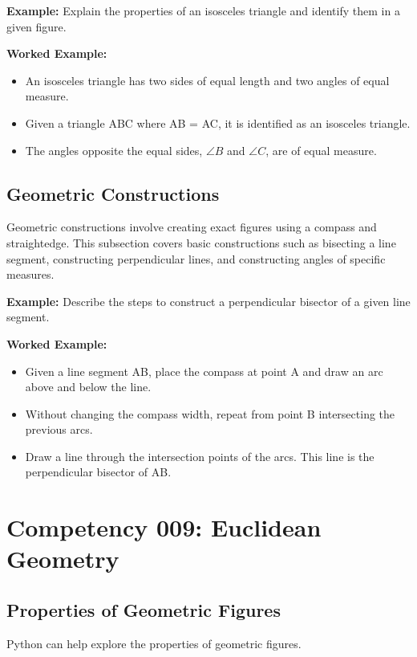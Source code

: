 \documentclass{book}
\begin{document}
\textbf{Example:} Explain the properties of an isosceles triangle and identify them in a given figure.


\textbf{Worked Example:}
\begin{itemize}
        \item An isosceles triangle has two sides of equal length and two angles of equal measure.
        \item Given a triangle ABC where AB = AC, it is identified as an isosceles triangle.
        \item The angles opposite the equal sides, \(\angle B\) and \(\angle C\), are of equal measure.
\end{itemize}


\subsection{Geometric Constructions}
Geometric constructions involve creating exact figures using a compass and straightedge. This subsection covers basic constructions such as bisecting a line segment, constructing perpendicular lines, and constructing angles of specific measures.


\textbf{Example:} Describe the steps to construct a perpendicular bisector of a given line segment.


\textbf{Worked Example:}
\begin{itemize}
        \item Given a line segment AB, place the compass at point A and draw an arc above and below the line.
        \item Without changing the compass width, repeat from point B intersecting the previous arcs.
        \item Draw a line through the intersection points of the arcs. This line is the perpendicular bisector of AB.
\end{itemize}


\section{Competency 009: Euclidean Geometry}
\subsection{Properties of Geometric Figures}
Python can help explore the properties of geometric figures.
\end{document}
